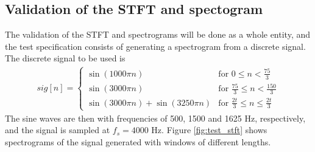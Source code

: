 \subsection{Validation of the STFT and spectogram}
The validation of the STFT and spectrograms will be done as a whole entity, and the test specification consists of generating a spectrogram from a discrete signal. The discrete signal to be used is
\begin{align}\label{eq:SPECTROsignal}
sig[n]=\begin{cases}\sin(1000\pi n)&\text{for }0\leq n<\frac{75}{3}\\
\sin(3000\pi n)&\text{for }\frac{75}{3}\leq n < \frac{150}{3}\\
\sin(3000\pi n)+\sin(3250\pi n)&\text{for }\frac{2t}{3}\leq n\leq\frac{2t}{3}
\end{cases}
\end{align}
The sine waves are then with frequencies of 500, 1500 and 1625 Hz, respectively, and the signal is sampled at $f_s=4000$ Hz. Figure \ref{fig:test_stft} shows spectrograms of the signal generated with windows of different lengths.
